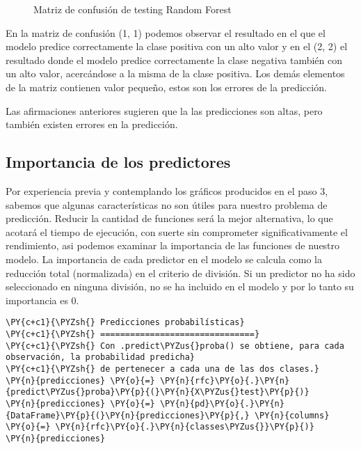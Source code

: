 \begin{center}
    	\begin{figure}[htb]
	\centering
	\caption{Matriz de confusión de testing Random Forest}
	\label{fig:mctrf}
	\end{figure}
\end{center}
    
    En la matriz de confusión (1, 1) podemos observar el resultado en el que
el modelo predice correctamente la clase positiva con un alto valor y en
el (2, 2) el resultado donde el modelo predice correctamente la clase
negativa también con un alto valor, acercándose a la misma de la clase
positiva. Los demás elementos de la matriz contienen valor pequeño,
estos son los errores de la predicción.

Las afirmaciones anteriores sugieren que la las predicciones son altas,
pero también existen errores en la predicción.

    \hypertarget{importancia-de-los-predictores}{%
\subsection{Importancia de los
predictores}\label{importancia-de-los-predictores}}

Por experiencia previa y contemplando los gráficos producidos en el paso
3, sabemos que algunas características no son útiles para nuestro
problema de predicción. Reducir la cantidad de funciones será la mejor
alternativa, lo que acotará el tiempo de ejecución, con suerte sin
comprometer significativamente el rendimiento, asi podemos examinar la
importancia de las funciones de nuestro modelo. La importancia de cada
predictor en el modelo se calcula como la reducción total (normalizada)
en el criterio de división. Si un predictor no ha sido seleccionado en
ninguna división, no se ha incluido en el modelo y por lo tanto su
importancia es 0.

    \begin{tcolorbox}[breakable, size=fbox, boxrule=1pt, pad at break*=1mm,colback=cellbackground, colframe=cellborder]
\begin{Verbatim}[commandchars=\\\{\}]
\PY{c+c1}{\PYZsh{} Predicciones probabilísticas}
\PY{c+c1}{\PYZsh{} ===============================}
\PY{c+c1}{\PYZsh{} Con .predict\PYZus{}proba() se obtiene, para cada observación, la probabilidad predicha}
\PY{c+c1}{\PYZsh{} de pertenecer a cada una de las dos clases.}
\PY{n}{predicciones} \PY{o}{=} \PY{n}{rfc}\PY{o}{.}\PY{n}{predict\PYZus{}proba}\PY{p}{(}\PY{n}{X\PYZus{}test}\PY{p}{)}
\PY{n}{predicciones} \PY{o}{=} \PY{n}{pd}\PY{o}{.}\PY{n}{DataFrame}\PY{p}{(}\PY{n}{predicciones}\PY{p}{,} \PY{n}{columns} \PY{o}{=} \PY{n}{rfc}\PY{o}{.}\PY{n}{classes\PYZus{}}\PY{p}{)}
\PY{n}{predicciones}
\end{Verbatim}
\end{tcolorbox}

